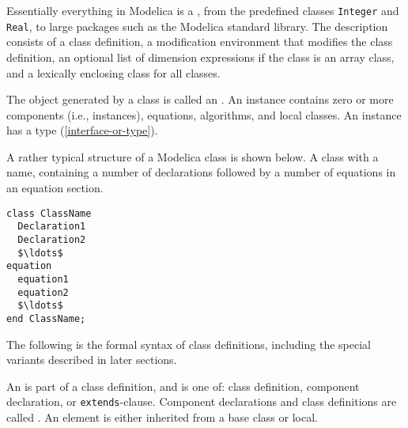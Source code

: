 Essentially everything in Modelica is a , from the predefined classes \lstinline!Integer! and \lstinline!Real!, to large packages such as the Modelica standard library.
The description consists of a class definition, a modification environment that modifies the class definition, an optional list of dimension expressions if the class is an array class, and a lexically enclosing class for all classes.

The object generated by a class is called an .
An instance contains zero or more components (i.e., instances), equations, algorithms, and local classes.
An instance has a type (\cref{interface-or-type}).

\begin{example}
A rather typical structure of a Modelica class is shown below.
A class with a name, containing a number of declarations followed by a number of equations in an equation section.
\begin{lstlisting}[language=modelica]
class ClassName
  Declaration1
  Declaration2
  $\ldots$
equation
  equation1
  equation2
  $\ldots$
end ClassName;
\end{lstlisting}
\end{example}

The following is the formal syntax of class definitions, including the special variants described in later sections.

An  is part of a class definition, and is one of: class definition, component declaration, or \lstinline!extends!-clause.
Component declarations and class definitions are called .
An element is either inherited from a base class or local.

